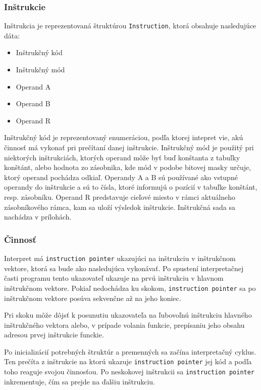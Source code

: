 \documentclass[12pt,a4paper,titlepage,final]{article}
\begin{document}
\subsubsection{Inštrukcie}
Inštrukcia je reprezentovaná štruktúrou \texttt{Instruction}, ktorá obsahuje nasledujúce dáta:
\begin{itemize}
    \itemsep0em
    \item Inštrukčný kód
    \item Inštrukčný mód
    \item Operand A
    \item Operand B
    \item Operand R
\end{itemize}
Inštrukčný kód je reprezentovaný enumeráciou, podľa ktorej intepret vie, akú činnosť má vykonať pri
prečítaní danej inštrukcie. Inštrukčný mód je použitý pri niektorých inštrukciách, ktorých operand
môže byť buď konštanta z tabuľky konštánt, alebo hodnota zo zásobnika, kde mód v podobe bitovej masky
určuje, ktorý operand pochádza odkiaľ. Operandy A a B sú používané ako vstupné operandy do inštrukcie a sú
to čísla, ktoré informujú o pozícií v tabuľke konštánt, resp. zásobníku. Operand R predstavuje cieľové miesto 
v rámci aktuálneho zásobníkového rámca, kam sa uloží výsledok inštrukcie. Inštrukčná sada sa nachádza v prílohách.

\subsubsection{Činnosť}
Interpret má \texttt{instruction pointer} ukazujúci na inštrukciu v inštrukčnom vektore,
ktorá sa bude ako nasledujúca vykonávať. Po spustení interpretačnej časti programu
tento ukazovateľ ukazuje na prvú inštrukciu v hlavnom inštrukčnom vektore. Pokiaľ nedochádza ku skokom,
\texttt{instruction pointer} sa po inštrukčnom vektore posúva sekvenčne až na jeho koniec.

Pri skoku môže dôjsť k posunutiu ukazovateľa na ľubovoľnú inštrukciu hlavného
inštrukčného vektora alebo, v prípade volania funkcie, prepísaniu jeho obsahu adresou prvej inštrukcie funckie.

Po inicializácií potrebných štruktúr a premenných sa začína interpretačný cyklus.
Ten prečíta z inštrukcie na ktorú ukazuje \texttt{instruction pointer} jej kód a podľa
toho reaguje svojou činnosťou. Po neskokovej inštrukcii sa \texttt{instruction pointer} inkrementuje,
čím sa prejde na ďalšiu inštrukciu.
\end{document}
